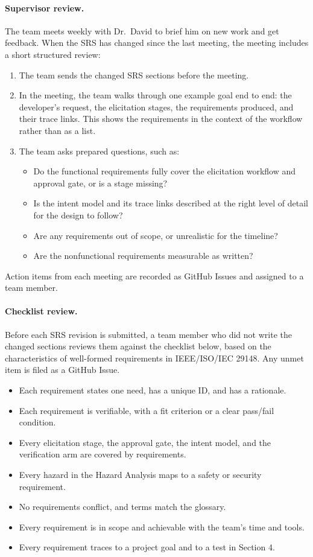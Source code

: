 \documentclass[12pt, titlepage]{article}
\begin{document}
\paragraph{Supervisor review.}
The team meets weekly with Dr.\ David to brief him on new work and get feedback.
When the SRS has changed since the last meeting, the meeting includes a short
structured review:
\begin{enumerate}
  \item The team sends the changed SRS sections before the meeting.
  \item In the meeting, the team walks through one example goal end to end:
  the developer's request, the elicitation stages, the requirements produced,
  and their trace links. This shows the requirements in the context of the
  workflow rather than as a list.
  \item The team asks prepared questions, such as:
  \begin{itemize}
    \item Do the functional requirements fully cover the elicitation workflow
    and approval gate, or is a stage missing?
    \item Is the intent model and its trace links described at the right level
    of detail for the design to follow?
    \item Are any requirements out of scope, or unrealistic for the timeline?
    \item Are the nonfunctional requirements measurable as written?
  \end{itemize}
\end{enumerate}
Action items from each meeting are recorded as GitHub Issues and assigned to a
team member.

\paragraph{Checklist review.}
Before each SRS revision is submitted, a team member who did not write the
changed sections reviews them against the checklist below, based on the
characteristics of well-formed requirements in IEEE/ISO/IEC 29148. Any unmet
item is filed as a GitHub Issue.

\begin{itemize}
  \item Each requirement states one need, has a unique ID, and has a rationale.
  \item Each requirement is verifiable, with a fit criterion or a clear
  pass/fail condition.
  \item Every elicitation stage, the approval gate, the intent model, and the
  verification arm are covered by requirements.
  \item Every hazard in the Hazard Analysis maps to a safety or security
  requirement.
  \item No requirements conflict, and terms match the glossary.
  \item Every requirement is in scope and achievable with the team's time and
  tools.
  \item Every requirement traces to a project goal and to a test in Section 4.
\end{itemize}
\end{document}

